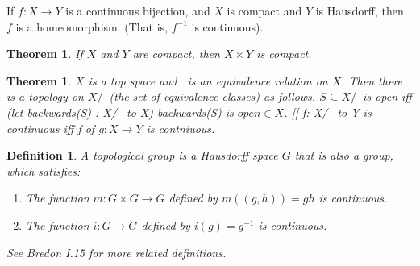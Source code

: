 \documentclass[11pt,leqno,oneside]{amsart}
\newcommand{\de}{\emph}
\theoremstyle{mystyle} \newtheorem{thrm}[thm]{Theorem}
\theoremstyle{mystyle} \newtheorem{defi}[thm]{Definition}
\begin{document}
\begin{cor}
	If $f : X \to Y$ is a continuous bijection, and $X$ is compact and $Y$ is Hausdorff, then $f$ is a homeomorphism. (That is, $f^{-1}$ is continuous).
\end{cor}
\begin{thrm}
	If $X$ and $Y$ are compact, then $X \times Y$ is compact.
\end{thrm}
\begin{thrm}
	$X$ is a top space and $~$ is an equivalence relation on $X$.  Then there is a topology on $X/~$ (the set of equivalence classes) as follows.  $S \subseteq X/~$ is open iff (let backwards(S) : X/~ to X) backwards(S) is $open \in X$.  [[ f: X/~ to Y is continuous iff f of $g: X \to Y$ is contniuous.
\end{thrm}
\begin{defi}
	A \de{topological group} is a Hausdorff space $G$ that is also a group, which satisfies:
	\begin{enumerate}
		\item The function $m : G \times G \to G$ defined by $m((g,h)) = gh$ is continuous.
		\item The function $i : G \to G$ defined by $i(g) = g^{-1}$ is continuous.
	\end{enumerate}
	See Bredon I.15 for more related definitions.
\end{defi}
\end{document}
